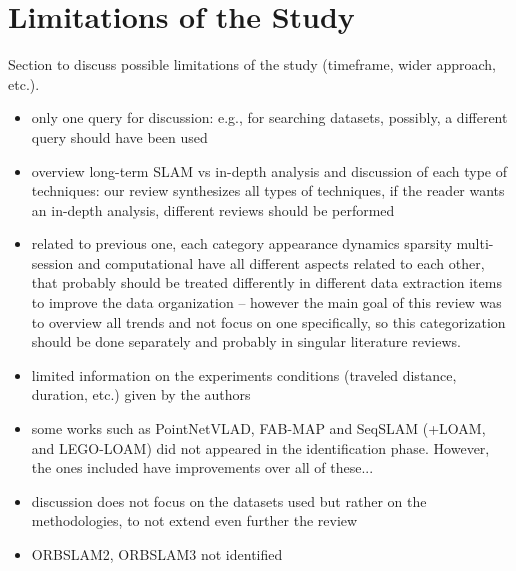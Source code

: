 \section{Limitations of the Study}
\label{sec:limitations}

Section to discuss possible limitations of the study (timeframe, wider approach, etc.).

\begin{itemize}[nosep]
\item only one query for discussion: e.g., for searching datasets, possibly, a different query should have been used
\item overview long-term SLAM vs in-depth analysis and discussion of each type of techniques: our review synthesizes all types of techniques, if the reader wants an in-depth analysis, different reviews should be performed
\item related to previous one, each category appearance dynamics sparsity multi-session and computational have all different aspects related to each other, that probably should be treated differently in different data extraction items to improve the data organization -- however the main goal of this review was to overview all trends and not focus on one specifically, so this categorization should be done separately and probably in singular literature reviews.
\item limited information on the experiments conditions (traveled distance, duration, etc.) given by the authors
\item some works such as PointNetVLAD, FAB-MAP and SeqSLAM (+LOAM, and LEGO-LOAM) did not appeared in the identification phase. However, the ones included have improvements over all of these...
\item discussion does not focus on the datasets used but rather on the methodologies, to not extend even further the review
\item ORBSLAM2, ORBSLAM3 not identified
\end{itemize}
